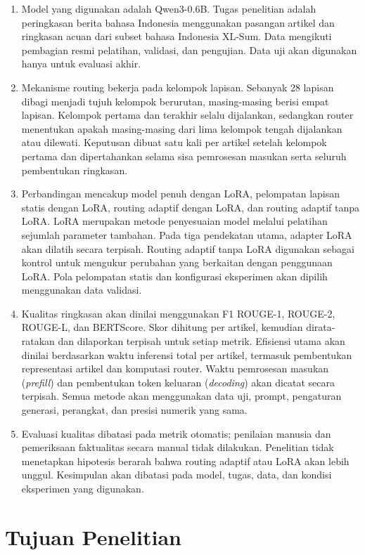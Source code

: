 \begin{enumerate}
  \item Model yang digunakan adalah Qwen3-0.6B. Tugas penelitian adalah peringkasan berita bahasa Indonesia menggunakan pasangan artikel dan ringkasan acuan dari subset bahasa Indonesia XL-Sum. Data mengikuti pembagian resmi pelatihan, validasi, dan pengujian. Data uji akan digunakan hanya untuk evaluasi akhir.
  \item Mekanisme routing bekerja pada kelompok lapisan. Sebanyak 28 lapisan dibagi menjadi tujuh kelompok berurutan, masing-masing berisi empat lapisan. Kelompok pertama dan terakhir selalu dijalankan, sedangkan router menentukan apakah masing-masing dari lima kelompok tengah dijalankan atau dilewati. Keputusan dibuat satu kali per artikel setelah kelompok pertama dan dipertahankan selama sisa pemrosesan masukan serta seluruh pembentukan ringkasan.
  \item Perbandingan mencakup model penuh dengan LoRA, pelompatan lapisan statis dengan LoRA, routing adaptif dengan LoRA, dan routing adaptif tanpa LoRA. LoRA merupakan metode penyesuaian model melalui pelatihan sejumlah parameter tambahan. Pada tiga pendekatan utama, adapter LoRA akan dilatih secara terpisah. Routing adaptif tanpa LoRA digunakan sebagai kontrol untuk mengukur perubahan yang berkaitan dengan penggunaan LoRA. Pola pelompatan statis dan konfigurasi eksperimen akan dipilih menggunakan data validasi.
  \item Kualitas ringkasan akan dinilai menggunakan F1 ROUGE-1, ROUGE-2, ROUGE-L, dan BERTScore. Skor dihitung per artikel, kemudian dirata-ratakan dan dilaporkan terpisah untuk setiap metrik. Efisiensi utama akan dinilai berdasarkan waktu inferensi total per artikel, termasuk pembentukan representasi artikel dan komputasi router. Waktu pemrosesan masukan (\textit{prefill}) dan pembentukan token keluaran (\textit{decoding}) akan dicatat secara terpisah. Semua metode akan menggunakan data uji, prompt, pengaturan generasi, perangkat, dan presisi numerik yang sama.
  \item Evaluasi kualitas dibatasi pada metrik otomatis; penilaian manusia dan pemeriksaan faktualitas secara manual tidak dilakukan. Penelitian tidak menetapkan hipotesis berarah bahwa routing adaptif atau LoRA akan lebih unggul. Kesimpulan akan dibatasi pada model, tugas, data, dan kondisi eksperimen yang digunakan.
\end{enumerate}

\section{Tujuan Penelitian}

